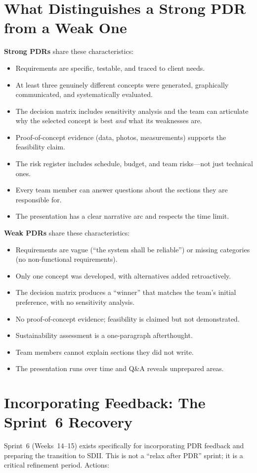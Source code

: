 \section{What Distinguishes a Strong PDR from a Weak One}
\textbf{Strong PDRs} share these characteristics:
\begin{itemize}[nosep,leftmargin=1.5em]
\item Requirements are specific, testable, and traced to client needs.
\item At least three genuinely different concepts were generated, graphically communicated, and systematically evaluated.
\item The decision matrix includes sensitivity analysis and the team can articulate why the selected concept is best \emph{and} what its weaknesses are.
\item Proof-of-concept evidence (data, photos, measurements) supports the feasibility claim.
\item The risk register includes schedule, budget, and team risks---not just technical ones.
\item Every team member can answer questions about the sections they are responsible for.
\item The presentation has a clear narrative arc and respects the time limit.
\end{itemize}

\textbf{Weak PDRs} share these characteristics:
\begin{itemize}[nosep,leftmargin=1.5em]
\item Requirements are vague (``the system shall be reliable'') or missing categories (no non-functional requirements).
\item Only one concept was developed, with alternatives added retroactively.
\item The decision matrix produces a ``winner'' that matches the team's initial preference, with no sensitivity analysis.
\item No proof-of-concept evidence; feasibility is claimed but not demonstrated.
\item Sustainability assessment is a one-paragraph afterthought.
\item Team members cannot explain sections they did not write.
\item The presentation runs over time and Q\&A reveals unprepared areas.
\end{itemize}

\section{Incorporating Feedback: The Sprint~6 Recovery}
Sprint~6 (Weeks~14--15) exists specifically for incorporating PDR feedback and preparing the transition to SDII. This is not a ``relax after PDR'' sprint; it is a critical refinement period. Actions:


